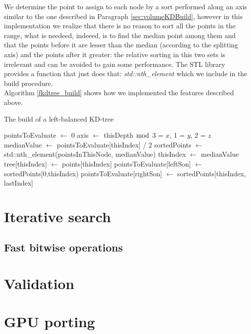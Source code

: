 We determine the point to assign to each node by a sort performed along an axis similar to the one described in Paragraph \ref{sec:volumeKDBuild}, however in this implementation we realize that there is no reason to sort all the points in the range, what is needeed, indeeed, is to find the median point among them and that the points before it are lesser than the median (according to the splitting axis) and the points after it greater: the relative sorting in this two sets is irrelevant and can be avoided to gain some performance. The STL library provides a function that just does that: \textit{std::nth\_element} which we include in the build procedure.\\
Algorithm \ref{fkdtree_build} shows how we implemented the features described above.\\

\begin{algorithm}
\caption{The build of a left-balanced KD-tree}
\label{fkdtree_build}
\begin{algorithmic}
  \State pointsToEvaluate $\gets$ 0
  \State axis $\gets$ thisDepth $\bmod$ 3  = $x$, 1 = $y$, 2 = $z$
	  	\State medianValue $\gets$ pointsToEvaluate[thisIndex] / 2
	  	\State sortedPoints $\gets$ std::nth\_element(pointsInThisNode, medianValue)
	  	\State thisIndex $\gets$ medianValue
	  	\State tree[thisIndex] $\gets$ points[thisIndex]
	  	\State pointsToEvaluate[leftSon] $\gets$ sortedPoints[0,thisIndex)
	  	\State pointsToEvaluate[rightSon] $\gets$ sortedPoints[thisIndex, lastIndex]
	  \EndFor
  \EndFor
\EndProcedure
\end{algorithmic}
\end{algorithm}

\section{Iterative search}

\subsection{Fast bitwise operations}

\section{Validation}

\section{GPU porting}

